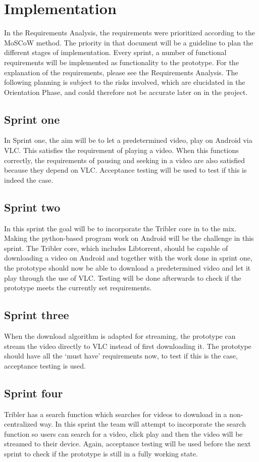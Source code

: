 \chapter{Implementation}
\label{sec:impl}
In the Requirements Analysis, the requirements were prioritized according to the MoSCoW method. The priority in that document will be a guideline to plan the different stages of implementation. Every sprint, a number of functional requirements will be implemented as functionality to the prototype. For the explanation of the requirements, please see the Requirements Analysis. The following planning is subject to the risks involved, which are elucidated in the Orientation Phase, and could therefore not be accurate later on in the project.

\section{Sprint one}
In Sprint one, the aim will be to let a predetermined video, play on Android via VLC. This satisfies the requirement of playing a video. When this functions correctly, the requirements of pausing and seeking in a video are also satisfied because they depend on VLC. Acceptance testing will be used to test if this is indeed the case.
\section{Sprint two}
In this sprint the goal will be to incorporate the Tribler core in to the mix. Making the python-based program work on Android will be the challenge in this sprint. The Tribler core, which includes Libtorrent, should be capable of downloading a video on Android and together with the work done in sprint one, the prototype should now be able to download a predetermined video and let it play through the use of VLC. Testing will be done afterwards to check if the prototype meets the currently set requirements.
\section{Sprint three}
When the download algorithm is adapted for streaming, the prototype can stream the video directly to VLC instead of first downloading it. The prototype should have all the `must have' requirements now, to test if this is the case, acceptance testing is used.
\section{Sprint four}
Tribler has a search function which searches for videos to download in a non-centralized way. In this sprint the team will attempt to incorporate the search function so users can search for a video, click play and then the video will be streamed to their device. Again, acceptance testing will be used before the next sprint to check if the prototype is still in a fully working state.
